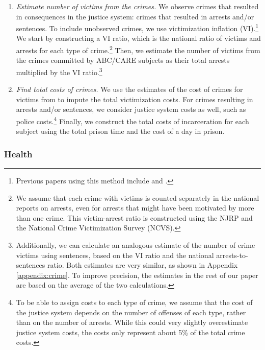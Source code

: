 \begin{enumerate}
\item \textit{Estimate number of victims from the crimes.} We observe crimes that resulted in consequences in the justice system: crimes that resulted in arrests and/or sentences. To include unobserved crimes, we use victimization inflation (VI).\footnote{Previous papers using this method include \citet{Belfield_Nores_etal_2006_JHR} and \cite{Heckman_Moon_etal_2010_RateofReturn}.} We start by constructing a VI ratio, which is the national ratio of victims and arrests for each type of crime.\footnote{We assume that each crime with victims is counted separately in the national reports on arrests, even for arrests that might have been motivated by more than one crime. This victim-arrest ratio is constructed using the NJRP and the National Crime Victimization Survey (NCVS).} Then, we estimate the number of victims from the crimes committed by ABC/CARE subjects as their total arrests multiplied by the VI ratio.\footnote{Additionally, we can calculate an analogous estimate of the number of crime victims using sentences, based on the VI ratio and the national arrests-to-sentences ratio. Both estimates are very similar, as shown in Appendix \ref{appendix:crime}. To improve precision, the estimates in the rest of our paper are based on the average of the two calculations.}

\item \textit{Find total costs of crimes.} We use the estimates of the cost of crimes for victims from \cite{McCollister_etal_2010_DAD} to impute the total victimization costs. For crimes resulting in arrests and/or sentences, we consider justice system costs as well, such as police costs.\footnote{To be able to assign costs to each type of crime, we assume that the cost of the justice system depends on the number of offenses of each type, rather than on the number of arrests. While this could very slightly overestimate justice system costs, the costs only represent about 5\% of the total crime costs.} Finally, we construct the total costs of incarceration for each subject using the total prison time and the cost of a day in prison.
\end{enumerate}

\subsubsection{Health} \label{section:health}

